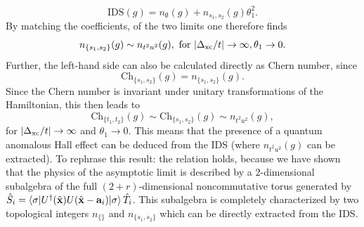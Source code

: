 \documentclass[
    10pt,
    aps,
    prb,
    twocolumn,
    floatfix,
    superscriptaddress,
]{revtex4-2}
\begin{document}
\begin{equation}
	\mathrm{IDS}(g) = n_\emptyset(g) + n_{s_1, s_2}(g) \theta_1^2 .
\end{equation}
By matching the coefficients, of the two limits one therefore finds
\begin{equation}
	n_{\lbrace s_1, s_2 \rbrace}(g) \sim n_{t^2 u^2}(g) , ~\text{for}~ | \Delta_\mathrm{xc} / t| \to \infty, \theta_1 \to 0 .
\end{equation}
Further, the left-hand side can also be calculated directly as Chern number, since
\begin{equation}
	\mathrm{Ch}_{\lbrace s_1, s_2 \rbrace}(g) = n_{\lbrace s_1, s_2 \rbrace}(g) .
\end{equation}
Since the Chern number is invariant under unitary transformations of the Hamiltonian, this then leads to
\begin{equation}
	\mathrm{Ch}_{\lbrace t_1, t_2 \rbrace}(g) \sim \mathrm{Ch}_{\lbrace s_1, s_2 \rbrace}(g)\sim n_{t^2 u^2}(g) , 
\end{equation}
for $| \Delta_\mathrm{xc} / t| \to \infty$ and $\theta_1 \to 0 $.
This means that the presence of a quantum anomalous Hall effect can be deduced from the IDS (where $n_{t^2 u^2}(g)$ can be extracted).
To rephrase this result: the relation holds, because we have shown that the physics of the asymptotic limit is described by a $2$-dimensional subalgebra of the full $(2+r)$-dimensional noncommutative torus generated by $	\hat{S}_i = \braket{\sigma |
U^\dagger ( \hat{\mathbf{x}}) U( \hat{\mathbf{x}} - \mathbf{a}_i) | \sigma } \hat{T}_i $.
This subalgebra is completely characterized by two topological integers $n_{\lbrace \rbrace}$ and $n_{\lbrace s_1, s_2 \rbrace}$ which can be directly extracted from the IDS.
\end{document}
